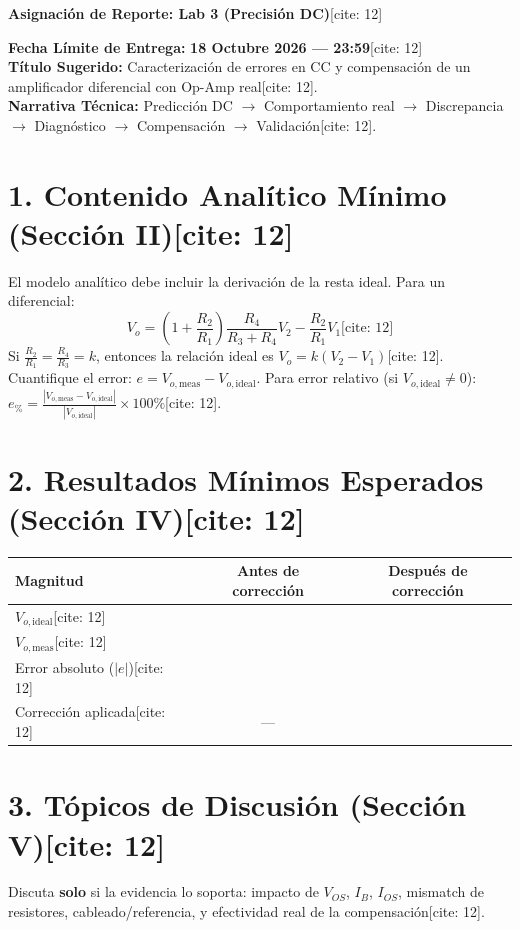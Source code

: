 \documentclass[11pt, a4paper]{article}
\begin{document}
\begin{center}
    \Large\textbf{\textcolor{ucbblue}{Asignación de Reporte: Lab 3 (Precisión DC)}}[cite: 12]
\end{center}

\textbf{Fecha Límite de Entrega:} \textbf{18 Octubre 2026 — 23:59}[cite: 12] \\
\textbf{Título Sugerido:} Caracterización de errores en CC y compensación de un amplificador diferencial con Op-Amp real[cite: 12]. \\
\textbf{Narrativa Técnica:} Predicción DC $\rightarrow$ Comportamiento real $\rightarrow$ Discrepancia $\rightarrow$ Diagnóstico $\rightarrow$ Compensación $\rightarrow$ Validación[cite: 12].

\section*{1. Contenido Analítico Mínimo (Sección II)[cite: 12]}
El modelo analítico debe incluir la derivación de la resta ideal. Para un diferencial:
\begin{equation}
    V_o = \left(1+\frac{R_2}{R_1}\right)\frac{R_4}{R_3+R_4}V_2 - \frac{R_2}{R_1}V_1 \text{[cite: 12]}
\end{equation}
Si $\frac{R_2}{R_1} = \frac{R_4}{R_3} = k$, entonces la relación ideal es $\boxed{V_o = k(V_2 - V_1)}$[cite: 12]. \\
Cuantifique el error: $\boxed{e = V_{o,\mathrm{meas}} - V_{o,\mathrm{ideal}}}$. Para error relativo (si $V_{o,\mathrm{ideal}} \neq 0$): $e_{\%} = \frac{|V_{o,\mathrm{meas}} - V_{o,\mathrm{ideal}}|}{|V_{o,\mathrm{ideal}}|} \times 100\%$[cite: 12].

\section*{2. Resultados Mínimos Esperados (Sección IV)[cite: 12]}
\begin{table}[h!]
    \centering
    \footnotesize
    \renewcommand{\arraystretch}{1.3}
    \begin{tabularx}{\textwidth}{|>{\raggedright\arraybackslash\hsize=1.0\hsize}X|c|c|}
    \hline
    \rowcolor[HTML]{EFEFEF} 
    \textbf{Magnitud} & \textbf{Antes de corrección} & \textbf{Después de corrección} \\ \hline
    $V_{o,\mathrm{ideal}}$[cite: 12] & & \\ \hline
    $V_{o,\mathrm{meas}}$[cite: 12] & & \\ \hline
    Error absoluto ($|e|$)[cite: 12] & & \\ \hline
    Corrección aplicada[cite: 12] & --- & \\ \hline
    \end{tabularx}
\end{table}

\section*{3. Tópicos de Discusión (Sección V)[cite: 12]}
Discuta \textbf{solo} si la evidencia lo soporta: impacto de $V_{OS}$, $I_B$, $I_{OS}$, mismatch de resistores, cableado/referencia, y efectividad real de la compensación[cite: 12].
\end{document}
